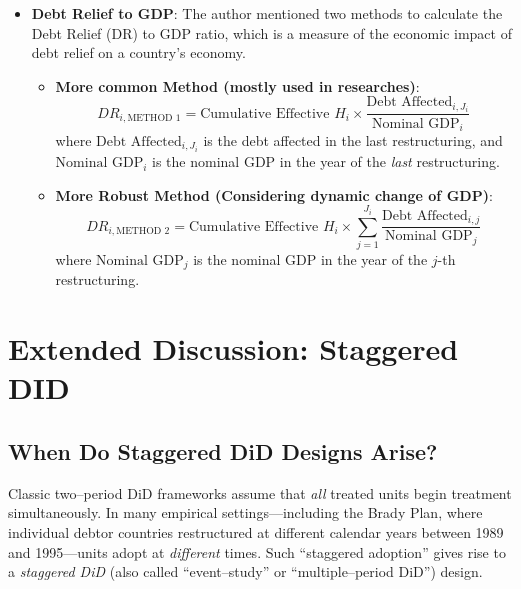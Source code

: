 \begin{itemize}
    \item \textbf{Debt Relief to GDP}:
    The author mentioned two methods to calculate the Debt Relief (DR) to GDP ratio, which is a measure of the economic impact of debt relief on a country's economy.
    \begin{itemize}
        \item \textbf{More common Method (mostly used in researches)}:
        \begin{equation}
            DR_{i, \text{METHOD 1}} = \text{Cumulative Effective } H_i \times \frac{\text{Debt Affected}_{i,J_i}}{\text{Nominal GDP}_i}
        \end{equation}
        where $\text{Debt Affected}_{i,J_i}$ is the debt affected in the last restructuring, and $\text{Nominal GDP}_i$ is the nominal GDP in the year of the \textit{last} restructuring.
        \item \textbf{More Robust Method (Considering dynamic change of GDP)}:
        \begin{equation}
            DR_{i, \text{METHOD 2}} = \text{Cumulative Effective } H_i \times \sum_{j=1}^{J_i} \frac{\text{Debt Affected}_{i,j}}{\text{Nominal GDP}_j}
        \end{equation}
        where $\text{Nominal GDP}_j$ is the nominal GDP in the year of the $j$-th restructuring.
    \end{itemize}
\end{itemize}

\section{Extended Discussion: Staggered DID}

\subsection{When Do Staggered DiD Designs Arise?}
Classic two--period DiD frameworks assume that \emph{all} treated units begin treatment simultaneously.  
In many empirical settings---including the Brady Plan, where individual debtor countries restructured at different calendar years between 1989 and 1995---units adopt at \emph{different} times.  
Such ``staggered adoption'' gives rise to a \emph{staggered DiD} (also called ``event--study'' or ``multiple--period DiD'') design.


